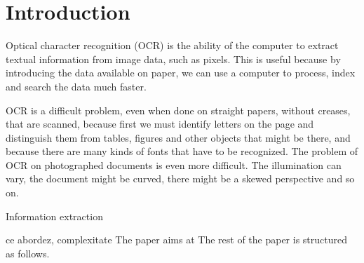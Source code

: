 \section{Introduction}
Optical character recognition (OCR) is the ability of the computer to extract textual information from image data, such as pixels. This is useful because by introducing the data available on paper, we can use a computer to process, index and search the data much faster.  

OCR is a difficult problem, even when done on straight papers, without creases, that are scanned, because first we must identify letters on the page and distinguish them from tables, figures and other objects that might be there, and because there are many kinds of fonts that have to be recognized. The problem of OCR on photographed documents is even more difficult. The illumination can vary, the document might be curved, there might be a skewed perspective and so on. 



Information extraction

ce abordez, complexitate
The paper aims at 
The rest of the paper is structured as follows.